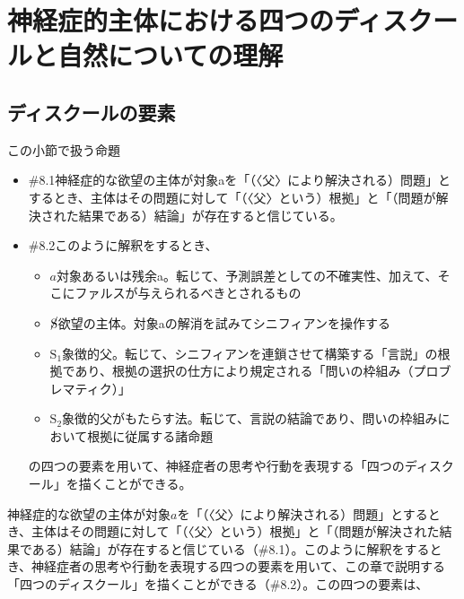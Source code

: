 \section{神経症的主体における四つのディスクールと自然についての理解}\label{ux795eux7d4cux75c7ux7684ux4e3bux4f53ux306bux304aux3051ux308bux56dbux3064ux306eux30c7ux30a3ux30b9ux30afux30fcux30ebux3068ux81eaux7136ux306bux3064ux3044ux3066ux306eux7406ux89e3}

\subsection{ディスクールの要素}\label{ux30c7ux30a3ux30b9ux30afux30fcux30ebux306eux8981ux7d20}

\begin{note}{この小節で扱う命題}
  \begin{itemize}
    \tightlist
    \item{\#8.1}神経症的な欲望の主体が対象aを「（〈父〉により解決される）問題」とするとき、主体はその問題に対して「（〈父〉という）根拠」と「（問題が解決された結果である）結論」が存在すると信じている。
    \item{\#8.2}このように解釈をするとき、
      \begin{itemize}
        \tightlist
        \item{$a$}対象あるいは残余a。転じて、予測誤差としての不確実性、加えて、そこにファルスが与えられるべきとされるもの
        \item{$\cancel{\textrm{S}}$}欲望の主体。対象aの解消を試みてシニフィアンを操作する
        \item{$\textrm{S}_1$}象徴的父。転じて、シニフィアンを連鎖させて構築する「言説」の根拠であり、根拠の選択の仕方により規定される「問いの枠組み（プロブレマティク）」
        \item{$\textrm{S}_2$}象徴的父がもたらす法。転じて、言説の結論であり、問いの枠組みにおいて根拠に従属する諸命題
      \end{itemize}の四つの要素を用いて、神経症者の思考や行動を表現する「四つのディスクール」を描くことができる。
  \end{itemize}
\end{note}

神経症的な欲望の主体が対象\(a\)を「（〈父〉により解決される）問題」とするとき、主体はその問題に対して「（〈父〉という）根拠」と「（問題が解決された結果である）結論」が存在すると信じている（\#8.1）。このように解釈をするとき、神経症者の思考や行動を表現する四つの要素を用いて、この章で説明する「四つのディスクール」を描くことができる（\#8.2）。この四つの要素は、

